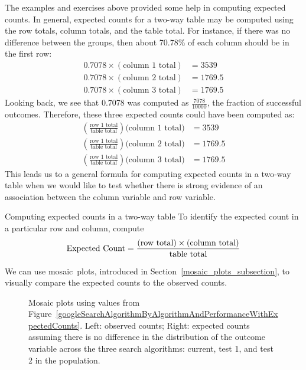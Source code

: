 The examples and exercises above provided some help in computing expected counts. In general, expected counts for a two-way table may be computed using the row totals, column totals, and the table total. For instance, if there was no difference between the groups, then about 70.78\% of each column should be in the first row:
\begin{align*}
0.7078\times (\text{column 1 total}) &= 3539 \\
0.7078\times (\text{column 2 total}) &= 1769.5 \\
0.7078\times (\text{column 3 total}) &= 1769.5
\end{align*}
Looking back, we see that 0.7078 was computed as $\frac{7078}{10000}$, the fraction of successful outcomes.  Therefore, these three expected counts could have been computed as:
\begin{align*}
\left(\frac{\text{row 1 total}}{\text{table total}}\right)\text{(column 1 total)} &= 3539 \\
\left(\frac{\text{row 1 total}}{\text{table total}}\right)\text{(column 2 total)} &= 1769.5 \\
\left(\frac{\text{row 1 total}}{\text{table total}}\right)\text{(column 3 total)} &= 1769.5
\end{align*}
\D{\newpage

\noindent}This leads us to a general formula for computing expected counts in a two-way table when we would like to test whether there is strong evidence of an association between the column variable and row variable.


\begin{onebox}{Computing expected counts in a two-way table}
To identify the expected count in a particular row and column, compute
$$\text{Expected Count} = \frac{(\text{row total}) \times  (\text{column total})}{\text{table total}}\vspace{2mm}$$\end{onebox}

We can use mosaic~plots, introduced in Section~\ref{mosaic_plots_subsection}, to visually compare the expected counts to the observed counts.  

\begin{figure}[h]
\caption{Mosaic plots using values from Figure~\ref{googleSearchAlgorithmByAlgorithmAndPerformanceWithExpectedCounts}.  Left: observed counts; Right: expected counts assuming there is no difference in the distribution of the outcome variable across the three search algorithms: current, test 1, and test 2 in the population.}
\label{pewEVmosaicplots}
\end{figure}

